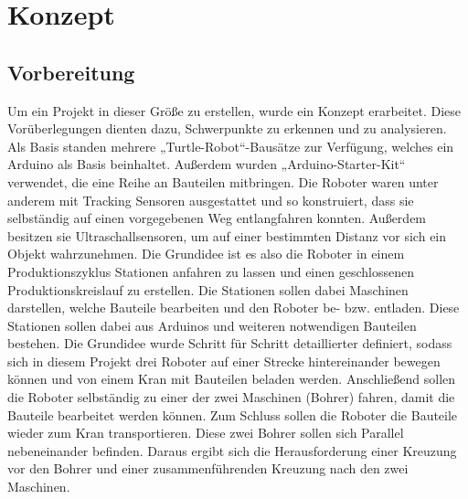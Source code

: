 \chapter{Konzept}


\section{Vorbereitung}
Um ein Projekt in dieser Größe zu erstellen, wurde ein Konzept erarbeitet. Diese Vorüberlegungen dienten dazu, Schwerpunkte zu erkennen und zu analysieren. Als Basis standen mehrere „Turtle-Robot“-Bausätze zur Verfügung, welches ein Arduino als Basis beinhaltet. Außerdem wurden „Arduino-Starter-Kit“ verwendet, die eine Reihe an Bauteilen mitbringen. Die Roboter waren unter anderem mit Tracking Sensoren ausgestattet und so konstruiert, dass sie selbständig auf einen vorgegebenen Weg entlangfahren konnten. Außerdem besitzen sie Ultraschallsensoren, um auf einer bestimmten Distanz vor sich ein Objekt wahrzunehmen.   
Die Grundidee ist es also die Roboter in einem Produktionszyklus Stationen anfahren zu lassen und einen geschlossenen Produktionskreislauf zu erstellen. Die Stationen sollen dabei Maschinen darstellen, welche Bauteile bearbeiten und den Roboter be- bzw. entladen. Diese Stationen sollen dabei aus Arduinos und weiteren notwendigen Bauteilen bestehen. Die Grundidee wurde Schritt für Schritt detaillierter definiert, sodass sich in diesem Projekt drei Roboter auf einer Strecke hintereinander bewegen können und von einem Kran mit Bauteilen beladen werden. Anschließend sollen die Roboter selbständig zu einer der zwei Maschinen (Bohrer) fahren, damit die Bauteile bearbeitet werden können. Zum Schluss sollen die Roboter die Bauteile wieder zum Kran transportieren. Diese zwei Bohrer sollen sich Parallel nebeneinander befinden. Daraus ergibt sich die Herausforderung einer Kreuzung vor den Bohrer und einer zusammenführenden Kreuzung nach den zwei Maschinen.
 
